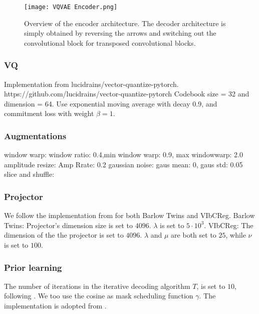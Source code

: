 \documentclass[../../thesis.tex]{subfiles}
\begin{document}
\begin{figure}[h]
    \label{fig:VQVAE Encoder}
    \texttt{[image: VQVAE Encoder.png]}
    \centering
    \caption{Overview of the encoder architecture. The decoder architecture is simply obtained by reversing the arrows and switching out the convolutional block for transposed convolutional blocks.}
\end{figure}

\subsubsection{VQ}
Implementation from lucidrains/vector-quantize-pytorch. https://github.com/lucidrains/vector-quantize-pytorch \newline
Codebook size = 32 and dimension = 64. \newline
Use exponential moving average with decay $0.9$, and commitment loss with weight $\beta = 1$.

\subsubsection{Augmentations}
window warp:    window ratio: 0.4,min window warp: 0.9, max windowwarp: 2.0\newline
amplitude resize: Amp Rrate: 0.2\newline
gaussian noise: gaus mean: 0, gaus std: 0.05\newline
slice and shuffle:\newline

\subsubsection{Projector}
We follow the implementation from \cite{lee2024computer} for both Barlow Twins and VIbCReg.\newline
Barlow Twins: Projector's dimension size is set to $4096$. $\lambda$ is set to $5\cdot10^3$. \newline
VIbCReg: The dimension of the the projector is set to $4096$. $\lambda$ and $\mu$ are both set to $25$, while $\nu$ is set to $100$.

\subsubsection{Prior learning}
The number of iterations in the iterative decoding algorithm $T$, is set to $10$, following \cite{chang2022maskgit}. We too use the cosine as mask scheduling function $\gamma$. The implementation is adopted from \cite{TimeVQVAE}. 
\end{document}
